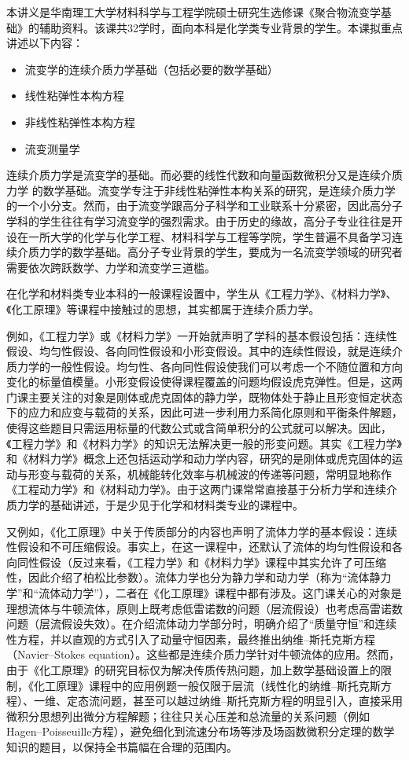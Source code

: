 \documentclass[main.tex]{subfiles}
\begin{document}
本讲义是华南理工大学材料科学与工程学院硕士研究生选修课《聚合物流变学基础》的辅助资料。该课共32学时，面向本科是化学类专业背景的学生。本课拟重点讲述以下内容：

\begin{itemize}
    \item 流变学的连续介质力学基础（包括必要的数学基础）
    \item 线性粘弹性本构方程
    \item 非线性粘弹性本构方程
    \item 流变测量学
\end{itemize}

连续介质力学是流变学的基础。而必要的线性代数和向量函数微积分又是连续介质力学 的数学基础。流变学专注于非线性粘弹性本构关系的研究，是连续介质力学的一个小分支。然而，由于流变学跟高分子科学和工业联系十分紧密，因此高分子学科的学生往往有学习流变学的强烈需求。由于历史的缘故，高分子专业往往是开设在一所大学的化学与化学工程、材料科学与工程等学院，学生普遍不具备学习连续介质力学的数学基础。高分子专业背景的学生，要成为一名流变学领域的研究者需要依次跨跃数学、力学和流变学三道槛。

在化学和材料类专业本科的一般课程设置中，学生从《工程力学》、《材料力学》、《化工原理》等课程中接触过的思想，其实都属于连续介质力学。

例如，《工程力学》或《材料力学》一开始就声明了学科的基本假设包括：连续性假设、均匀性假设、各向同性假设和小形变假设。其中的连续性假设，就是连续介质力学的一般性假设。均匀性、各向同性假设使我们可以考虑一个不随位置和方向变化的标量值模量。小形变假设使得课程覆盖的问题均假设虎克弹性。但是，这两门课主要关注的对象是刚体或虎克固体的静力学，既物体处于静止且形变恒定状态下的应力和应变与载荷的关系，因此可进一步利用力系简化原则和平衡条件解题，使得这些题目只需运用标量的代数公式或含简单积分的公式就可以解决。因此，《工程力学》和《材料力学》的知识无法解决更一般的形变问题。其实《工程力学》和《材料力学》概念上还包括运动学和动力学内容，研究的是刚体或虎克固体的运动与形变与载荷的关系，机械能转化效率与机械波的传递等问题，常明显地称作《工程动力学》和《材料动力学》。由于这两门课常常直接基于分析力学和连续介质力学的基础讲述，于是少见于化学和材料类专业的课程中。

又例如，《化工原理》中关于传质部分的内容也声明了流体力学的基本假设：连续性假设和不可压缩假设。事实上，在这一课程中，还默认了流体的均匀性假设和各向同性假设（反过来看，《工程力学》和《材料力学》课程中其实允许了可压缩性，因此介绍了柏松比参数）。流体力学也分为静力学和动力学（称为“流体静力学”和“流体动力学”），二者在《化工原理》课程中都有涉及。这门课关心的对象是理想流体与牛顿流体，原则上既考虑低雷诺数的问题（层流假设）也考虑高雷诺数问题（层流假设失效）。在介绍流体动力学部分时，明确介绍了“质量守恒”和连续性方程，并以直观的方式引入了动量守恒因素，最终推出纳维--斯托克斯方程（Navier--Stokes equation）。这些都是连续介质力学针对牛顿流体的应用。然而，由于《化工原理》的研究目标仅为解决传质传热问题，加上数学基础设置上的限制，《化工原理》课程中的应用例题一般仅限于层流（线性化的纳维--斯托克斯方程）、一维、定态流问题，甚至可以越过纳维--斯托克斯方程的明显引入，直接采用微积分思想列出微分方程解题；往往只关心压差和总流量的关系问题（例如Hagen--Poisseuille方程），避免细化到流速分布场等涉及场函数微积分定理的数学知识的题目，以保持全书篇幅在合理的范围内。
\end{document}
